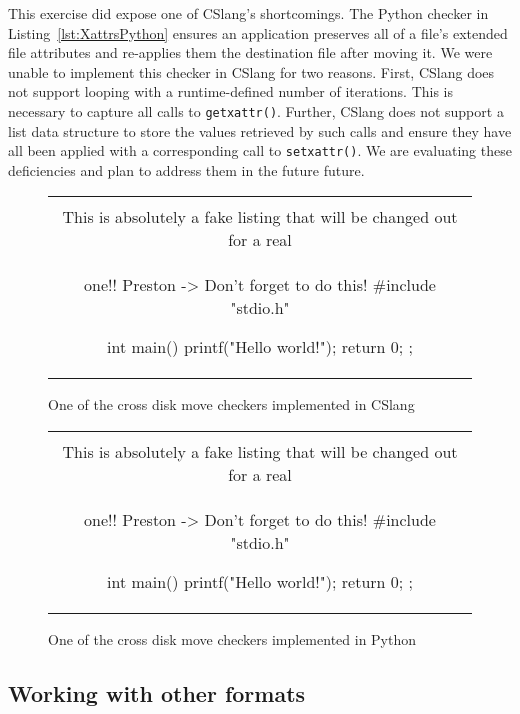 This exercise did expose one of CSlang's shortcomings.
The Python checker in Listing~\ref{lst:XattrsPython} ensures an application
preserves all of a file's extended file attributes and re-applies them the
destination file after moving it.  We were unable to implement this checker
in CSlang for two reasons.  First, CSlang does not support looping with a
runtime-defined number of iterations.  This is necessary to capture all
calls to {\tt getxattr()}.
Further, CSlang does not support a list data structure to store the values
retrieved by such calls and ensure they have all been applied with a
corresponding call to {\tt setxattr()}.
We are evaluating these deficiencies and plan to address them in the future
future.

\begin{figure}[H]
\centering
\begin{tabular}{c}
\begin{lstlisting}
\\ This is absolutely a fake listing that will be changed out for a real
\\ one!!  Preston -> Don't forget to do this!
#include "stdio.h"

int main() {
    printf("Hello world!\n");
    return 0;
};
\end{lstlisting}
\end{tabular}
\caption{One of the cross disk move checkers implemented in CSlang}
\label{lst:Cross-DiskMoveCSlang}
\end{figure}


\begin{figure}[H]
\centering
\begin{tabular}{c}
\begin{lstlisting}
\\ This is absolutely a fake listing that will be changed out for a real
\\ one!!  Preston -> Don't forget to do this!
#include "stdio.h"

int main() {
    printf("Hello world!\n");
    return 0;
};
\end{lstlisting}
\end{tabular}
\caption{One of the cross disk move checkers implemented in Python}
\label{lst:Cross-DiskMovePython}
\end{figure}

\subsection{Working with other formats}

